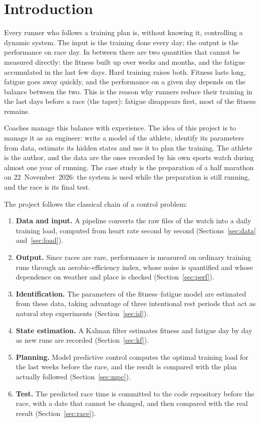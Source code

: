 
\section{Introduction}\label{sec:intro}

Every runner who follows a training plan is, without knowing it, controlling a
dynamic system. The input is the training done every day; the output is the
performance on race day. In between there are two quantities that cannot be
measured directly: the fitness built up over weeks and months, and the fatigue
accumulated in the last few days. Hard training raises both. Fitness lasts
long, fatigue goes away quickly, and the performance on a given day depends on
the balance between the two. This is the reason why runners reduce their
training in the last days before a race (the taper): fatigue disappears first,
most of the fitness remains.

Coaches manage this balance with experience. The idea of this project is to
manage it as an engineer: write a model of the athlete, identify its
parameters from data, estimate its hidden states and use it to plan the
training. The athlete is the author, and the data are the ones recorded by his
own sports watch during almost one year of running. The case study is the
preparation of a half marathon on 22~November~2026: the system is used while
the preparation is still running, and the race is its final test.

The project follows the classical chain of a control problem:
\begin{enumerate}
  \item \textbf{Data and input.} A pipeline converts the raw files of the
  watch into a daily training load, computed from heart rate second by second
  (Sections~\ref{sec:data} and~\ref{sec:load}).
  \item \textbf{Output.} Since races are rare, performance is measured on
  ordinary training runs through an aerobic-efficiency index, whose noise is
  quantified and whose dependence on weather and place is checked
  (Section~\ref{sec:perf}).
  \item \textbf{Identification.} The parameters of the fitness--fatigue model
  are estimated from these data, taking advantage of three intentional rest
  periods that act as natural step experiments (Section~\ref{sec:id}).
  \item \textbf{State estimation.} A Kalman filter estimates fitness and
  fatigue day by day as new runs are recorded (Section~\ref{sec:kf}).
  \item \textbf{Planning.} Model predictive control computes the optimal
  training load for the last weeks before the race, and the result is compared
  with the plan actually followed (Section~\ref{sec:mpc}).
  \item \textbf{Test.} The predicted race time is committed to the code
  repository before the race, with a date that cannot be changed, and then
  compared with the real result (Section~\ref{sec:race}).
\end{enumerate}

